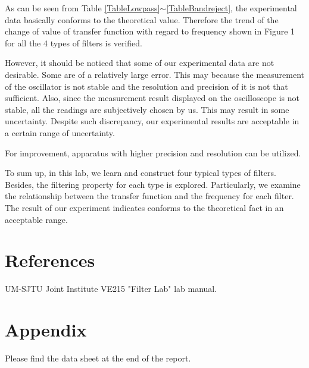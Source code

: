 \documentclass{article}
\begin{document}
As can be seen from Table \ref{TableLowpass}$\sim$\ref{TableBandreject}, the experimental data basically conforms to the theoretical value. Therefore the trend of the change of value of transfer function with regard to frequency shown in Figure 1 for all the 4 types of filters is verified.

However, it should be noticed that some of our experimental data are not desirable. Some are of a relatively large error. This may because the measurement of the oscillator is not stable and the resolution and precision of it is not that sufficient. Also, since the measurement result displayed on the oscilloscope is not stable, all the readings are subjectively chosen by us. This may result in some uncertainty. Despite such discrepancy, our experimental results are acceptable in a certain range of uncertainty.

For improvement, apparatus with higher precision and resolution can be utilized.

To sum up, in this lab, we learn and construct four typical types of filters. Besides, the filtering property for each type is explored. Particularly, we examine the relationship between the transfer function and the frequency for each filter. The result of our experiment indicates conforms to the theoretical fact in an acceptable range.

\section{References}
\noindent [1] UM-SJTU Joint Institute VE215 "Filter Lab" lab manual.

\section{Appendix}

Please find the data sheet at the end of the report.


\end{document}
